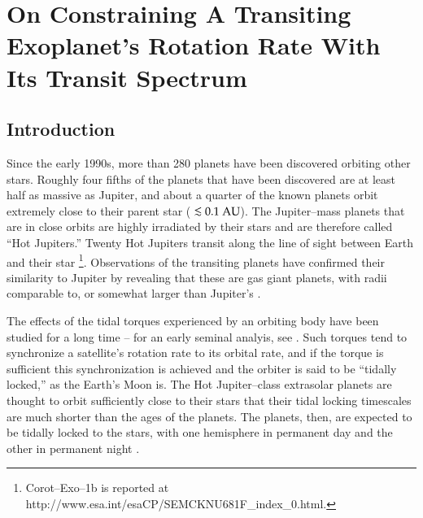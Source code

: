 \chapter[On Constraining A Transiting Exoplanet's Rotation Rate With Its Transit Spectrum]{On Constraining A Transiting Exoplanet's Rotation Rate With Its Transit Spectrum}
\label{ch:rot}
\markright{}



\section{Introduction}
\label{rot_sec:intro}
Since the early 1990s, more than 280 planets have been discovered
orbiting other stars.  Roughly four fifths of the planets that have
been discovered are at least half as massive as Jupiter, and about a
quarter of the known planets orbit extremely close to their parent
star ($\lsim 0.1 {\rm~AU}$).  The Jupiter--mass planets that are in
close orbits are highly irradiated by their stars and are therefore
called ``Hot Jupiters.''  Twenty Hot Jupiters transit along the line
of sight between Earth and their star \citep{charbonneau_et_al2000,
  henry_et_al2000, konacki_et_al2003, bouchy_et_al2004,
  pont_et_al2004, konacki_et_al2004, konacki_et_al2005,
  udalski_et_al2002a, udalski_et_al2002b, udalski_et_al2002c,
  udalski_et_al2003, udalski_et_al2004, alonso_et_al2004,
  bouchy_et_al2005, mccullough_et_al2006, odonovan_et_al2006b,
  bakos_et_al2006, collier_et_al2006, burke_et_al2007,
  gillon_et_al2007, bakos_et_al2007a, bakos_et_al2007bb,
  johnskrull_et_al2007}\footnote{Corot--Exo--1b is reported at
  http://www.esa.int/esaCP/SEMCKNU681F\_index\_0.html.}.  Observations
of the transiting planets have confirmed their similarity to Jupiter
by revealing that these are gas giant planets, with radii comparable
to, or somewhat larger than Jupiter's \citep{charbonneau_et_al2000,
  henry_et_al2000, gaudi2005}.

The effects of the tidal torques experienced by an orbiting body have
been studied for a long time -- for an early seminal analyis, see
\citet{goldreich+peale1966}.  Such torques tend to synchronize a
satellite's rotation rate to its orbital rate, and if the torque is
sufficient this synchronization is achieved and the orbiter is said to
be ``tidally locked,'' as the Earth's Moon is.  The Hot Jupiter--class
extrasolar planets are thought to orbit sufficiently close to their
stars that their tidal locking timescales are much shorter than the
ages of the planets.  The planets, then, are expected to be tidally
locked to the stars, with one hemisphere in permanent day and the
other in permanent night \citep{harrington_et_al2006}.

